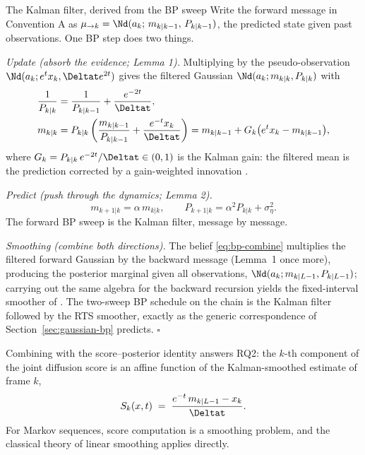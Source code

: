 \begin{toolbox}{The Kalman filter, derived from the BP sweep}
Write the forward message in Convention A as
$\mu_{\to k} = \Nd(a_k;\, m_{k|k-1},\, P_{k|k-1})$, the predicted state
given past observations. One BP step does two things.

\emph{Update (absorb the evidence; Lemma 1).} Multiplying by the
pseudo-observation $\Nd(a_k; e^t x_k, \Deltat e^{2t})$ gives the filtered
Gaussian $\Nd(a_k; m_{k|k}, P_{k|k})$ with
\begin{align*}
  \frac{1}{P_{k|k}} &= \frac{1}{P_{k|k-1}} + \frac{e^{-2t}}{\Deltat},\\
  m_{k|k} &= P_{k|k} \left( \frac{m_{k|k-1}}{P_{k|k-1}}
        + \frac{e^{-t} x_k}{\Deltat} \right)
  = m_{k|k-1} + G_k \big( e^{t} x_k - m_{k|k-1} \big),
\end{align*}
where $G_k = P_{k|k}\, e^{-2t}/\Deltat \in (0,1)$ is the Kalman gain: the
filtered mean is the prediction corrected by a gain-weighted innovation
\citep{kalman1960new}.

\emph{Predict (push through the dynamics; Lemma 2).}
\begin{equation*}
  m_{k+1|k} = \alpha\, m_{k|k},
  \qquad
  P_{k+1|k} = \alpha^2 P_{k|k} + \sigma_\eta^2 .
\end{equation*}
The forward BP sweep is the Kalman filter, message by message.

\emph{Smoothing (combine both directions).} The belief
\eqref{eq:bp-combine} multiplies the filtered forward Gaussian by the
backward message (Lemma~1 once more), producing the posterior marginal
given all observations, $\Nd(a_k; m_{k|L-1}, P_{k|L-1})$; carrying out
the same algebra for the backward recursion yields the fixed-interval
smoother of \citet{rauch1965maximum}. The two-sweep BP schedule on the
chain is the Kalman filter followed by the RTS smoother, exactly as the
generic correspondence of Section~\ref{sec:gaussian-bp} predicts.
\hfill$\square$
\end{toolbox}

Combining with the score--posterior identity answers RQ2: the $k$-th
component of the joint diffusion score is an affine function of the
Kalman-smoothed estimate of frame $k$,
\begin{equation}
  S_k(x, t)
  \;=\; \frac{e^{-t}\, m_{k|L-1} - x_k}{\Deltat} .
  \label{eq:bp-score-kalman}
\end{equation}
For Markov sequences, score computation is a smoothing problem, and the
classical theory of linear smoothing applies directly.

